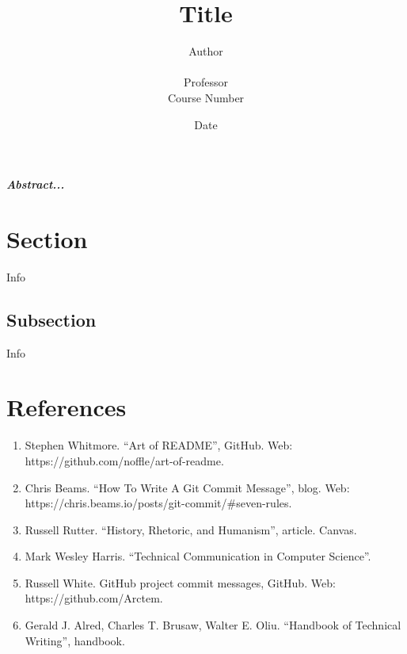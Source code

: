 \documentclass{article}
\title{\LARGE \bf
Title
}
\author{
Author\rule[25pt]{0pt}{0pt}\\
Professor\\
Course Number
}
\begin{document}
\maketitle

\bigskip
\date{Date}
\bigskip


\textit{\textbf{
\hspace{10mm} Abstract...
}}

\section{Section}
\label{ref:section_ref}
\hspace{10mm} Info

\subsection{Subsection}
\label{ref:subsection_ref}
\hspace{10mm} Info

\section{References}
\label{ref:references}
\begin{enumerate}
\item Stephen Whitmore. ``Art of README'', GitHub. Web: https://github.com/noffle/art-of-readme.
\item Chris Beams. ``How To Write A Git Commit Message'', blog. Web: https://chris.beams.io/posts/git-commit/\#seven-rules.
\item Russell Rutter. ``History, Rhetoric, and Humanism'', article. Canvas.
\item Mark Wesley Harris. ``Technical Communication in Computer Science''.
\item Russell White. GitHub project commit messages, GitHub. Web: https://github.com/Arctem.
\item Gerald J. Alred, Charles T. Brusaw, Walter E. Oliu. ``Handbook of Technical Writing'', handbook.
\end{enumerate}
\end{document}
